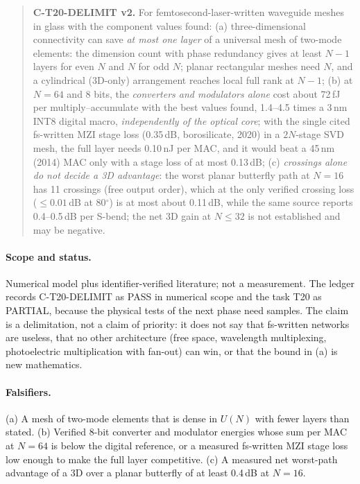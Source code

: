 \documentclass[11pt,a4paper]{article}
\newcommand{\dB}{\,dB\xspace}
\newcommand{\fJ}{\,fJ\xspace}
\begin{document}
\begin{quote}
\textbf{C-T20-DELIMIT v2.} For femtosecond-laser-written waveguide meshes in glass with the component values found:
(a) three-dimensional connectivity can save \emph{at most one layer} of a universal mesh of two-mode elements: the dimension count with phase redundancy gives at least $N-1$ layers for even $N$ and $N$ for odd $N$; planar rectangular meshes need $N$, and a cylindrical (3D-only) arrangement reaches local full rank at $N-1$;
(b) at $N=64$ and 8 bits, the \emph{converters and modulators alone} cost about 72\fJ per multiply--accumulate with the best values found, 1.4--4.5 times a 3\,nm INT8 digital macro, \emph{independently of the optical core}; with the single cited fs-written MZI stage loss (0.35\dB, borosilicate, 2020) in a $2N$-stage SVD mesh, the full layer needs 0.10\,nJ per MAC, and it would beat a 45\,nm (2014) MAC only with a stage loss of at most 0.13\dB;
(c) \emph{crossings alone do not decide a 3D advantage}: the worst planar butterfly path at $N=16$ has 11 crossings (free output order), which at the only verified crossing loss ($\le0.01$\dB at 80$^\circ$) is at most about 0.11\dB, while the same source reports 0.4--0.5\dB per S-bend; the net 3D gain at $N\le32$ is not established and may be negative.
\end{quote}

\paragraph{Scope and status.} Numerical model plus identifier-verified literature; not a measurement. The ledger records C-T20-DELIMIT as PASS in numerical scope and the task T20 as PARTIAL, because the physical tests of the next phase need samples. The claim is a delimitation, not a claim of priority: it does not say that fs-written networks are useless, that no other architecture (free space, wavelength multiplexing, photoelectric multiplication with fan-out) can win, or that the bound in (a) is new mathematics.

\paragraph{Falsifiers.} (a) A mesh of two-mode elements that is dense in $U(N)$ with fewer layers than stated. (b) Verified 8-bit converter and modulator energies whose sum per MAC at $N=64$ is below the digital reference, or a measured fs-written MZI stage loss low enough to make the full layer competitive. (c) A measured net worst-path advantage of a 3D over a planar butterfly of at least 0.4\dB at $N=16$.
\end{document}
